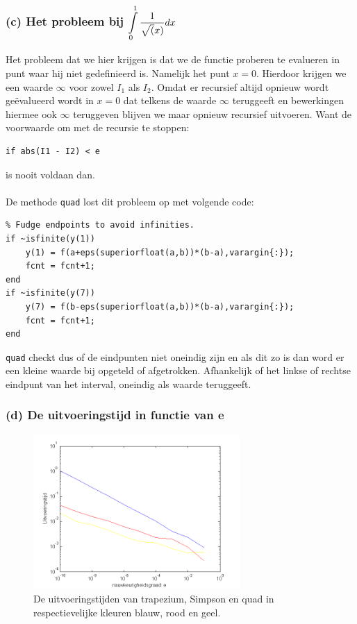 \documentclass[11pt,a4paper]{article}
\begin{document}
\subsubsection*{(c) Het probleem bij $\mathop{\mathlarger{\int\limits_{0}^1\frac{1}{\sqrt(x)}dx}}$}
Het probleem dat we hier krijgen is dat we de functie proberen te evalueren in punt waar hij niet gedefinieerd is. Namelijk het punt $x=0$. Hierdoor krijgen we een waarde $\infty$ voor zowel $I_1$ als $I_2$. Omdat er recursief altijd opnieuw wordt ge\"evalueerd wordt in $x=0$ dat telkens de waarde $\infty$ teruggeeft en bewerkingen hiermee ook $\infty$ teruggeven blijven we maar opnieuw recursief uitvoeren. Want de voorwaarde om met de recursie te stoppen: 
\begin{verbatim}
if abs(I1 - I2) < e
\end{verbatim}
is nooit voldaan dan.
\\
\\
De methode \verb|quad| lost dit probleem op met volgende code:
\begin{verbatim}
% Fudge endpoints to avoid infinities.
if ~isfinite(y(1))
    y(1) = f(a+eps(superiorfloat(a,b))*(b-a),varargin{:});
    fcnt = fcnt+1;
end
if ~isfinite(y(7))
    y(7) = f(b-eps(superiorfloat(a,b))*(b-a),varargin{:});
    fcnt = fcnt+1;
end
\end{verbatim}
\verb|quad| checkt dus of de eindpunten niet oneindig zijn en als dit zo is dan word er een kleine waarde bij opgeteld of afgetrokken. Afhankelijk of het linkse of rechtse eindpunt van het interval, oneindig als waarde teruggeeft.
\subsubsection*{(d) De uitvoeringstijd in functie van e }

\begin{figure}[H]
	\centering
	\includegraphics[width=0.7\textwidth]{12d1.png}
	\caption*{De uitvoeringstijden van trapezium, Simpson en quad in respectievelijke kleuren blauw, rood en geel.}
	\end{figure}
\end{document}
